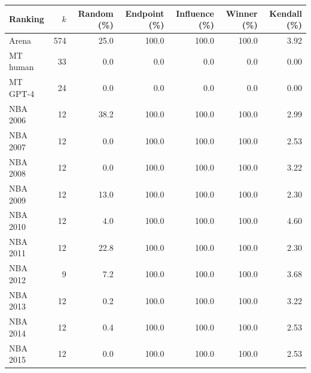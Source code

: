 \begin{tabular}{lrrrrrr}
\toprule
Ranking & $k$ & Random (\%) & Endpoint (\%) & Influence (\%) & Winner (\%) & Kendall (\%) \\
\midrule
Arena & 574 & 25.0 & 100.0 & 100.0 & 100.0 & 3.92 \\
MT human & 33 & 0.0 & 0.0 & 0.0 & 0.0 & 0.00 \\
MT GPT-4 & 24 & 0.0 & 0.0 & 0.0 & 0.0 & 0.00 \\
NBA 2006 & 12 & 38.2 & 100.0 & 100.0 & 100.0 & 2.99 \\
NBA 2007 & 12 & 0.0 & 100.0 & 100.0 & 100.0 & 2.53 \\
NBA 2008 & 12 & 0.0 & 100.0 & 100.0 & 100.0 & 3.22 \\
NBA 2009 & 12 & 13.0 & 100.0 & 100.0 & 100.0 & 2.30 \\
NBA 2010 & 12 & 4.0 & 100.0 & 100.0 & 100.0 & 4.60 \\
NBA 2011 & 12 & 22.8 & 100.0 & 100.0 & 100.0 & 2.30 \\
NBA 2012 & 9 & 7.2 & 100.0 & 100.0 & 100.0 & 3.68 \\
NBA 2013 & 12 & 0.2 & 100.0 & 100.0 & 100.0 & 3.22 \\
NBA 2014 & 12 & 0.4 & 100.0 & 100.0 & 100.0 & 2.53 \\
NBA 2015 & 12 & 0.0 & 100.0 & 100.0 & 100.0 & 2.53 \\
\bottomrule
\end{tabular}
